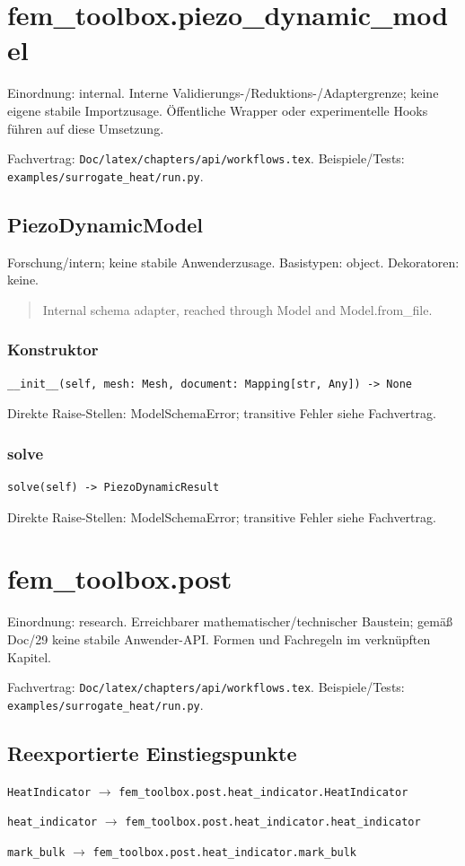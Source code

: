\section{fem\_toolbox.piezo\_dynamic\_model}
Einordnung: internal. Interne Validierungs-/Reduktions-/Adaptergrenze; keine eigene stabile Importzusage. Öffentliche Wrapper oder experimentelle Hooks führen auf diese Umsetzung.
\par Fachvertrag: \nolinkurl{Doc/latex/chapters/api/workflows.tex}. Beispiele/Tests:
\nolinkurl{examples/surrogate_heat/run.py}.
\subsection{PiezoDynamicModel}
Forschung/intern; keine stabile Anwenderzusage.
Basistypen: object. Dekoratoren: keine.
\begin{quote}
Internal schema adapter, reached through Model and Model.from\_file.
\end{quote}
\subsubsection*{Konstruktor}
\begin{lstlisting}
__init__(self, mesh: Mesh, document: Mapping[str, Any]) -> None
\end{lstlisting}
Direkte Raise-Stellen: ModelSchemaError; transitive Fehler siehe Fachvertrag.
\subsubsection*{solve}
\begin{lstlisting}
solve(self) -> PiezoDynamicResult
\end{lstlisting}
Direkte Raise-Stellen: ModelSchemaError; transitive Fehler siehe Fachvertrag.
\section{fem\_toolbox.post}
Einordnung: research. Erreichbarer mathematischer/technischer Baustein; gemäß Doc/29 keine stabile Anwender-API. Formen und Fachregeln im verknüpften Kapitel.
\par Fachvertrag: \nolinkurl{Doc/latex/chapters/api/workflows.tex}. Beispiele/Tests:
\nolinkurl{examples/surrogate_heat/run.py}.
\subsection*{Reexportierte Einstiegspunkte}
\noindent\nolinkurl{HeatIndicator} $\to$ \nolinkurl{fem_toolbox.post.heat_indicator.HeatIndicator}\par
\noindent\nolinkurl{heat_indicator} $\to$ \nolinkurl{fem_toolbox.post.heat_indicator.heat_indicator}\par
\noindent\nolinkurl{mark_bulk} $\to$ \nolinkurl{fem_toolbox.post.heat_indicator.mark_bulk}\par
